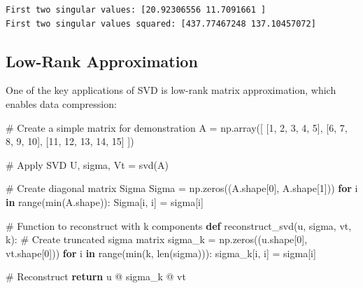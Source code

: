 \documentclass[
  letterpaper,
  DIV=11,
  numbers=noendperiod]{scrreprt}
\newenvironment{Shaded}{\begin{snugshade}}{\end{snugshade}}
\newcommand{\BuiltInTok}[1]{\textcolor[rgb]{0.00,0.23,0.31}{#1}}
\newcommand{\CommentTok}[1]{\textcolor[rgb]{0.37,0.37,0.37}{#1}}
\newcommand{\ControlFlowTok}[1]{\textcolor[rgb]{0.00,0.23,0.31}{\textbf{#1}}}
\newcommand{\DecValTok}[1]{\textcolor[rgb]{0.68,0.00,0.00}{#1}}
\newcommand{\KeywordTok}[1]{\textcolor[rgb]{0.00,0.23,0.31}{\textbf{#1}}}
\newcommand{\NormalTok}[1]{\textcolor[rgb]{0.00,0.23,0.31}{#1}}
\newcommand{\OperatorTok}[1]{\textcolor[rgb]{0.37,0.37,0.37}{#1}}
\begin{document}
\begin{verbatim}
First two singular values: [20.92306556 11.7091661 ]
First two singular values squared: [437.77467248 137.10457072]
\end{verbatim}

\subsection{Low-Rank Approximation}\label{low-rank-approximation}

One of the key applications of SVD is low-rank matrix approximation,
which enables data compression:

\begin{Shaded}
\begin{Highlighting}[]
\CommentTok{\# Create a simple matrix for demonstration}
\NormalTok{A }\OperatorTok{=}\NormalTok{ np.array([}
\NormalTok{    [}\DecValTok{1}\NormalTok{, }\DecValTok{2}\NormalTok{, }\DecValTok{3}\NormalTok{, }\DecValTok{4}\NormalTok{, }\DecValTok{5}\NormalTok{],}
\NormalTok{    [}\DecValTok{6}\NormalTok{, }\DecValTok{7}\NormalTok{, }\DecValTok{8}\NormalTok{, }\DecValTok{9}\NormalTok{, }\DecValTok{10}\NormalTok{],}
\NormalTok{    [}\DecValTok{11}\NormalTok{, }\DecValTok{12}\NormalTok{, }\DecValTok{13}\NormalTok{, }\DecValTok{14}\NormalTok{, }\DecValTok{15}\NormalTok{]}
\NormalTok{])}

\CommentTok{\# Apply SVD}
\NormalTok{U, sigma, Vt }\OperatorTok{=}\NormalTok{ svd(A)}

\CommentTok{\# Create diagonal matrix Sigma}
\NormalTok{Sigma }\OperatorTok{=}\NormalTok{ np.zeros((A.shape[}\DecValTok{0}\NormalTok{], A.shape[}\DecValTok{1}\NormalTok{]))}
\ControlFlowTok{for}\NormalTok{ i }\KeywordTok{in} \BuiltInTok{range}\NormalTok{(}\BuiltInTok{min}\NormalTok{(A.shape)):}
\NormalTok{    Sigma[i, i] }\OperatorTok{=}\NormalTok{ sigma[i]}

\CommentTok{\# Function to reconstruct with k components}
\KeywordTok{def}\NormalTok{ reconstruct\_svd(u, sigma, vt, k):}
    \CommentTok{\# Create truncated sigma matrix}
\NormalTok{    sigma\_k }\OperatorTok{=}\NormalTok{ np.zeros((u.shape[}\DecValTok{0}\NormalTok{], vt.shape[}\DecValTok{0}\NormalTok{]))}
    \ControlFlowTok{for}\NormalTok{ i }\KeywordTok{in} \BuiltInTok{range}\NormalTok{(}\BuiltInTok{min}\NormalTok{(k, }\BuiltInTok{len}\NormalTok{(sigma))):}
\NormalTok{        sigma\_k[i, i] }\OperatorTok{=}\NormalTok{ sigma[i]}
    
    \CommentTok{\# Reconstruct}
    \ControlFlowTok{return}\NormalTok{ u }\OperatorTok{@}\NormalTok{ sigma\_k }\OperatorTok{@}\NormalTok{ vt}


\end{Highlighting}
\end{Shaded}
\end{document}
